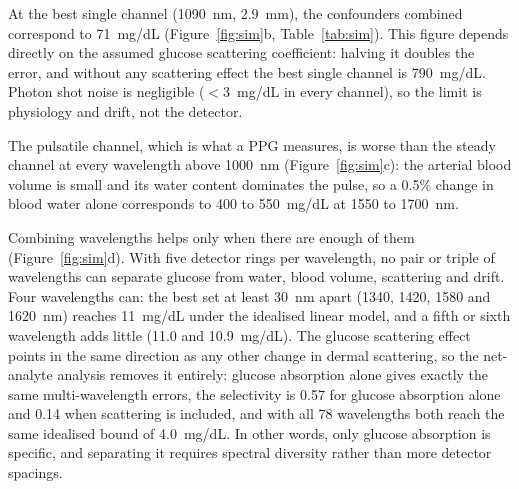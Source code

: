 \documentclass[11pt]{article}
\newcommand{\mgdl}{mg/dL}
\begin{document}
At the best single channel (1090~nm, 2.9~mm), the confounders combined correspond to 71~\mgdl{} (Figure~\ref{fig:sim}b, Table~\ref{tab:sim}). This figure depends directly on the assumed glucose scattering coefficient: halving it doubles the error, and without any scattering effect the best single channel is 790~\mgdl{}. Photon shot noise is negligible ($<3$~\mgdl{} in every channel), so the limit is physiology and drift, not the detector.

The pulsatile channel, which is what a PPG measures, is worse than the steady channel at every wavelength above 1000~nm (Figure~\ref{fig:sim}c): the arterial blood volume is small and its water content dominates the pulse, so a 0.5\% change in blood water alone corresponds to 400 to 550~\mgdl{} at 1550 to 1700~nm.

Combining wavelengths helps only when there are enough of them (Figure~\ref{fig:sim}d). With five detector rings per wavelength, no pair or triple of wavelengths can separate glucose from water, blood volume, scattering and drift. Four wavelengths can: the best set at least 30~nm apart (1340, 1420, 1580 and 1620~nm) reaches 11~\mgdl{} under the idealised linear model, and a fifth or sixth wavelength adds little (11.0 and 10.9~\mgdl{}). The glucose scattering effect points in the same direction as any other change in dermal scattering, so the net-analyte analysis removes it entirely: glucose absorption alone gives exactly the same multi-wavelength errors, the selectivity is 0.57 for glucose absorption alone and 0.14 when scattering is included, and with all 78 wavelengths both reach the same idealised bound of 4.0~\mgdl{}. In other words, only glucose absorption is specific, and separating it requires spectral diversity rather than more detector spacings.
\end{document}
